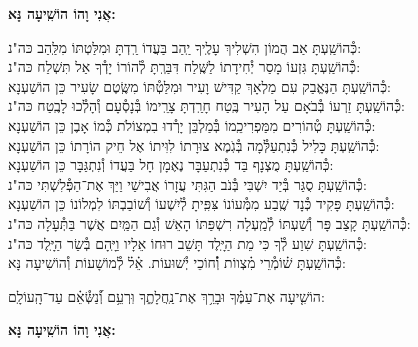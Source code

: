 \documentclass[twoside, openany, parskip=half, 11pt]{book}
\begin{document}
\begin{large}
\textbf{אֲנִי וָהוֹ הוֹשִֽׁיעָה נָּא:}
\end{large}

\begin{small}
כְּ֯הוֹשַֽׁעְתָּ אַב הֲמוֹן הִשְׁלִיךְ עָלֶֽיךָ יַֽהַב בַּעֲדוֹ רַֽדְתָּ וּמִלַּטְתּוֹ מִלַּֽהַב \hfill כּה"נ:\\
כְּ֯הוֹשַֽׁעְתָּ גִּזְעוֹ מָסַר יְ֯חִידָתוֹ לַשֶּֽׁלַח דִּבַּרְֽתָּ לְ֯הוֹרוֹ יָדְ֯ךָ אַל תִּשְׁלַח \hfill כּה"נ: \\
כְּ֯הוֹשַֽׁעְתָּ הַנֶּאֱבַק עִם מַלְאָךְ קַדִּישׁ וָעִיר וּמִלַּטְ֯תּוֹ מִשֶּֽׂטֶם שָׂעִיר \hfill כֵּן הוֹשַׁעְנָא: \\
כְּ֯הוֹשַֽׁעְתָּ זַרְעוֹ בְּ֯בֹאָם עַל הָעִיר בֶּֽטַח חָרַֽדְתָּ צָרֵֽימוֹ בְּ֯נָסְ֯עָם וְ֯הָלְ֯כוּ לָבֶֽטַח \hfill כּה"נ: \\
כְּ֯הוֹשַֽׁעְתָּ טְ֯הוֹרִים מִמַּפְרִיכֵֽמוֹ בְּ֯מַלְבֵּן יָרְ֯דוּ בִמְצוֹלֹת כְּ֯מוֹ אָבֶן \hfill כֵּן הוֹשַׁעְנָא: \\
כְּ֯הוֹשַֽׁעְתָּ כָּלִיל כְּ֯נִתְעַלְּ֯מָה בְּ֯גֹֽמֶא צוּרָתוֹ לִוִּיתוֹ אֶל חֵיק הוֹרָתוֹ \hfill כֵּן הוֹשַׁעְנָא: \\
כְּ֯הוֹשַֽׁעְתָּ מֻצְנָף בַּד כְּ֯נִתְעַבָּר נֶאֶמָן חָל בַּעֲדוֹ וְ֯נִתְגַּבָּר \hfill כֵּן הוֹשַׁעְנָא: \\
כְּ֯הוֹשַֽׁעְתָּ סֻגַּר בְּ֯יַד יִשְׁבִּי בְּ֯נֹב הַגִּתִּי עֲזָרוֹ אֲבִישַׁי וַיַּךְ אֶת־הַפְּ֯לִשְׁתִּי \hfill כּה"נ:\\
כְּ֯הוֹשַֽׁעְתָּ פָּקִיד כְּ֯נָד שֶֽׁבַע מִמְּ֯עוֹנוֹ צִּפִּֽיתָ לְ֯יִשְׁעוֹ וְ֯שׁוֹבַבְתּוֹ לִמְלוֹנוֹ \hfill כֵּן הוֹשַׁעְנָא:\\
כְּ֯הוֹשַֽׁעְתָּ קָצַב פָּר וְ֯שַׁעְתּוֹ לְ֯מַֽעְלָה רִשְׁפַּתּוֹ הָאֵשׁ וְ֯גַם הַמַּֽיִם אֲשֶׁר בַּתְּ֯עָלָה \hfill כּה"נ:\\
כְּ֯הוֹשַֽׁעְתָּ שִׁוַע לְ֯ךָ כִּי מֵת הַיָּֽלֶד תָּשֵׁב רוּחוֹ אֵלָיו וַיָּֽהָם בְּ֯שַׂר הַיָּֽלֶד \hfill כּה"נ:\\
כְּ֯הוֹשַֽׁעְתָּ שׁ֗וֹמְ֯רֵי מִ֗צְווֹת וְ֯֗חוֹכֵי יְ֯שׁוּעוֹת. אֵ֗ל֗ לְ֯מוֹשָׁעוֹת \hfill וְ֯הוֹשִׁיעָה נָּא:\\

\end{small}

הוֹשִׁ֤יעָה אֶת־עַמֶּ֗ךָ וּבָרֵ֥ךְ אֶת־נַֽחֲלָתֶ֑ךָ וּֽרְעֵ֥ם וְ֯֝נַשְּׂ֯אֵ֗ם עַד־הָֽעוֹלָֽם:


\begin{large}
\textbf{אֲנִי וָהוֹ הוֹשִֽׁיעָה נָּא:}
\end{large}
\end{document}
